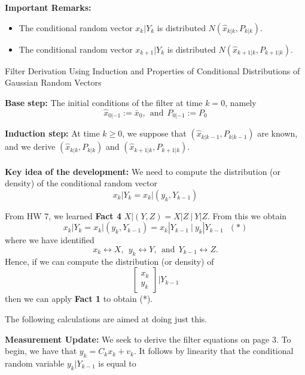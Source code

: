 \documentclass[letterpaper]{article}
\begin{document}
\textbf{Important Remarks:}
\begin{itemize}
\setlength{\itemsep}{.5cm}
\item The conditional random vector $ x_k | Y_k $ is distributed $N(\widehat{x}_{k|k}, P_{k|k})$.
\item  The conditional random vector $ x_{k+1} | Y_{k} $ is distributed $N(\widehat{x}_{k+1|k}, P_{k+1|k})$.
\end{itemize}

 \newpage
 {\Large \bf
\begin{center}
 Filter Derivation Using Induction and Properties of Conditional Distributions of Gaussian Random Vectors
\end{center}
}

\noindent \textbf{Base step:} The initial conditions of the filter at time $k=0$, namely
$$ \widehat{x}_{0|-1} :=\bar{x}_0,~~\mbox{and}~~P_{0|-1}:=P_0$$

\noindent \textbf{Induction step:} At time $k\ge0$, we suppose that $(\widehat{x}_{k|k-1}, P_{k|k-1})$ are known, and we derive $(\widehat{x}_{k|k}, P_{k|k})$ and $(\widehat{x}_{k+1|k}, P_{k+1|k})$.\\ \\

\noindent \textbf{Key idea of the development:} We need to compute the distribution (or density) of the conditional random vector
$$x_k | Y_k = x_k | (y_k, Y_{k-1}) $$

From HW 7, we learned \textbf{Fact 4} $ X |(Y,Z) = X|Z ~\Big|~ Y|Z$. From this we obtain
 $$x_k | Y_k = x_k | (y_k, Y_{k-1}) = x_k | Y_{k-1} ~\Big\rvert~ y_k | Y_{k-1}~~~(*)$$
 where we have identified
 $$x_k \leftrightarrow X,~~y_k \leftrightarrow Y ,~~\text{and}~~ Y_{k-1} \leftrightarrow Z.$$
 Hence, if we can compute the distribution (or density) of
 $$\left[\begin{array}{c}x_k \\ y_k\end{array} \right] \Big| {Y_{k-1}} $$
 then we can apply \textbf{Fact 1} to obtain (*).

The following calculations are aimed at doing just this.

\newpage

\noindent  \textbf{Measurement Update:}  We seek to derive the filter equations on page 3. To begin, we have that $y_k = C_k x_k + v_k$. It follows by linearity that the conditional random variable $y_k | Y_{k-1}$ is equal to
\end{document}
